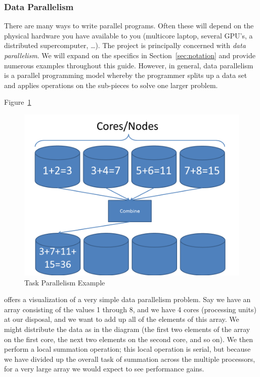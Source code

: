 \subsubsection{Data Parallelism}

There are many ways to write parallel programs. Often these will depend on
the physical hardware you have available to you (multicore laptop, several
GPU's, a distributed supercomputer, \dots). The  project is
principally concerned with \emph{data parallelism}. We will expand on the
specifics in Section~\ref{sec:notation} and provide numerous examples
throughout this guide. However, in general, data parallelism is a parallel
programming model whereby the programmer splits up a data set and applies
operations on the sub-pieces to solve one larger problem.

Figure~\ref{fig:dataparallel} 
\begin{figure}[h]
 \centering
 \includegraphics[scale=.45]{pbdDEMO-include/pics/parallelism_data}
 \caption{Task Parallelism Example}
 \label{fig:dataparallel}
\end{figure}
offers a visualization of a very simple data parallelism problem. Say we
have an array consisting of the values 1 through 8, and we have 4 cores
(processing units) at our disposal, and we want to add up all of the elements
of this array. We might distribute the data as in the diagram (the first
two elements of the array on the first core, the next two elements on the
second core, and so on). We then perform a local summation operation;
this local operation is serial, but because we have divided up the overall
task of summation across the multiple processors, for a very large array
we would expect to see performance gains.

